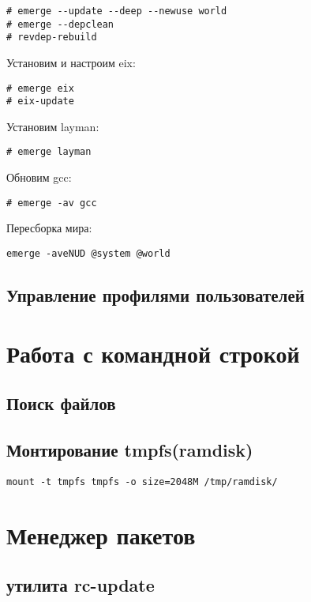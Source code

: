 \documentclass[10pt, a4paper]{article}
\begin{document}
\begin{verbatim}
# emerge --update --deep --newuse world
# emerge --depclean
# revdep-rebuild
\end{verbatim}

Установим и настроим eix:
\begin{verbatim}
# emerge eix
# eix-update
\end{verbatim}

Установим layman:
\begin{verbatim}
# emerge layman
\end{verbatim}

Обновим gcc:
\begin{verbatim}
# emerge -av gcc
\end{verbatim}

Пересборка мира:
\begin{verbatim}
emerge -aveNUD @system @world
\end{verbatim}

\subsection{Управление профилями пользователей}

\newpage 

\section{Работа с командной строкой}

\subsection{Поиск файлов}

\subsection{Монтирование tmpfs(ramdisk)}

\begin{verbatim}
mount -t tmpfs tmpfs -o size=2048M /tmp/ramdisk/
\end{verbatim}

\newpage

\section{Менеджер пакетов}

\subsection{утилита rc-update}
\end{document}

